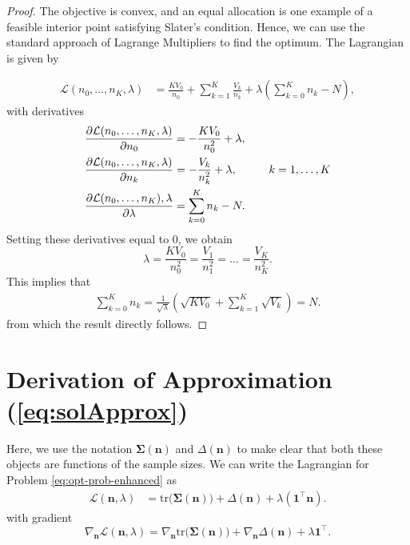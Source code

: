 \documentclass{article}
\newcommand{\bsSig}{\boldsymbol  \Sigma}
\newcommand{\bsn}{\boldsymbol n}
\newcommand{\Tr}{\text{tr}}
\begin{document}
\begin{proof}
The objective is convex, and an equal allocation is one example of a feasible interior point satisfying Slater's condition. Hence, we can use the standard approach of Lagrange Multipliers to find the optimum. The Lagrangian is given by

\begin{align*}
\mathcal{L}(n_0, \dots, n_K, \lambda) &= \frac{K V_0}{n_0} + \sum_{k = 1}^K \frac{V_k}{n_k} + \lambda \left( \sum_{k = 0}^K n_k - N \right),
\end{align*}
with derivatives 
\begin{align*}
\frac{\partial \mathcal{L}(n_0, \dots, n_K, \lambda) }{\partial n_0} &= - \frac{K V_0}{n_0^2} + \lambda,\\
\frac{\partial \mathcal{L}(n_0, \dots, n_K, \lambda) }{\partial n_k} &= - \frac{V_k}{n_k^2} + \lambda, \hspace{10mm} k = 1, \dots, K \\
\frac{\partial \mathcal{L}(n_0, \dots, n_K), \lambda }{\partial \lambda} &= \sum_{k = 0}^K n_k - N. 
\end{align*}
Setting these derivatives equal to 0, we obtain
\begin{equation}\label{eq:eqDeriv}
\lambda = \frac{K V_0}{n_0^2} = \frac{V_1}{n_1^2} = \dots = \frac{V_K}{n_K^2}.
\end{equation}
This implies that 
\begin{align*}
\sum_{k = 0}^K n_k = \frac{1}{\sqrt{\lambda}} \left( \sqrt{K V_0} + \sum_{k = 1}^K \sqrt{V_k} \right)  = N. 
\end{align*}
from which the result directly follows. 
\end{proof}

\section{Derivation of Approximation (\ref{eq:solApprox})}\label{appendix:solApprox}


Here, we use the notation $\bsSig(\bsn)$ and $\Delta(\bsn)$ to make clear that both these objects are functions of the sample sizes. We can write the Lagrangian for Problem \ref{eq:opt-prob-enhanced} as
\begin{align*}
\mathcal{L}(\bsn, \lambda) &= \Tr\big(\bsSig(\bsn)\big) + \Delta (\bsn) + \lambda \left( \boldsymbol 1^\top \bsn \right).
\end{align*}
with gradient 
\[ \nabla_{\bsn}\mathcal{L}(\bsn, \lambda) = \nabla_{\bsn} \Tr\big(\bsSig(\bsn)\big) + \nabla_{\bsn} \Delta (\bsn) + \lambda \boldsymbol 1^\top.
\]
\end{document}
